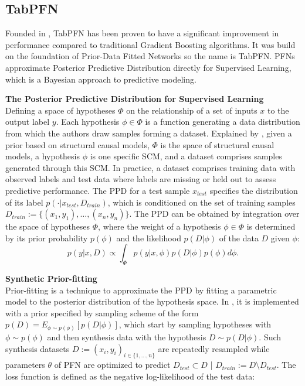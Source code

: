 \documentclass[../main.tex]{subfiles}
\begin{document}
\subsection{TabPFN}

Founded in , TabPFN has been proven to have a significant improvement in performance compared to traditional Gradient Boosting algorithms.
It was build on the foundation of Prior-Data Fitted Networks so the name is TabPFN.
PFNs approximate Posterior Predictive Distribution directly for Supervised Learning, which is a Bayesian approach to predictive modeling.

\textbf{The Posterior Predictive Distribution for Supervised Learning} \\
Defining a space of hypotheses $\Phi$ on the relationship of a set of inputs $x$ to the output label $y$.
Each hypothesis $\phi \in \Phi$ is a function generating a data distribution from which the authors draw samples forming a dataset.
Explained by \citeauthor{tabpfn}, given a prior based on structural causal models, $\Phi$ is the space of structural causal models, a hypothesis $\phi$ is one specific SCM, and a dataset comprises samples generated through this SCM.
In practice, a dataset comprises training data with observed labels and test data where labels are missing or held out to assess predictive performance.
The PPD for a test sample $x_{test}$ specifies the distribution of its label $p(\cdot|x_{test},D_{train})$, which is conditioned on the set of training samples $D_{train} := \{(x_1,y_1), \dots, (x_n,y_n)\}$.
The PPD can be obtained by integration over the space of hypotheses $\Phi$, where the weight of a hypothesis $\phi\in\Phi$ is determined by its prior probability $p(\phi)$ and the likelihood $p(D|\phi)$ of the data $D$ given $\phi$:
\begin{equation}
    p(y|x,D) \propto \int_{\Phi} p(y|x,\phi) p(D|\phi) p(\phi) d\phi.
    \label{eq:ppd}
\end{equation}


\textbf{Synthetic Prior-fitting}\\
Prior-fitting is a technique to approximate the PPD by fitting a parametric model to the posterior distribution of the hypothesis space.
In , it is implemented with a prior specified by sampling scheme of the form $p(D)=E_{\phi \sim p(\phi)}[p(D|\phi)]$, which start by sampling hypotheses with $\phi \sim p(\phi)$ and then synthesis data with the hypothesis $D \sim p(D|\phi)$.
Such synthesis datasets $D := (x_i, y_i)_{i \in \{1, \dots, n\}}$ are repeatedly resampled while parameters $\theta$ of PFN are optimized to predict $D_{test} \subset D$ | $D_{train} := D \setminus D_{test}$.
The loss function is defined as the negative log-likelihood of the test data:
\end{document}
